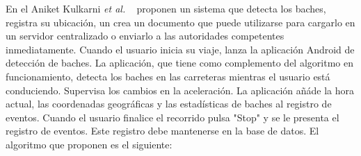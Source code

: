 En el Aniket Kulkarni {\it et al.} ~\cite{kulkarni2014pothole} proponen un sistema que detecta los baches, registra su ubicación, un crea un documento que
puede utilizarse para cargarlo en un servidor centralizado o enviarlo  a las autoridades competentes inmediatamente.  Cuando el usuario inicia su viaje,
lanza la aplicación Android de detección de baches. La aplicación, que tiene como complemento del algoritmo en funcionamiento, detecta los baches en las
carreteras mientras el usuario está conduciendo. Supervisa los cambios en la aceleración. La aplicación añáde la hora actual, las coordenadas geográficas
y las estadísticas de baches al registro de eventos. Cuando el usuario  finalice el recorrido pulsa "Stop"  y se le presenta el registro de eventos. Este
registro debe mantenerse en la base de datos.  El algoritmo que proponen es el siguiente:\\\\
\noindent

